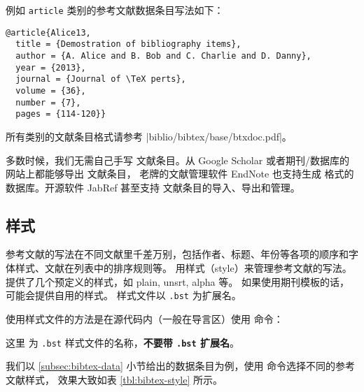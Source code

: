 例如 \texttt{article} 类别的参考文献数据条目写法如下：
\begin{verbatim}
@article{Alice13,
  title = {Demostration of bibliography items},
  author = {A. Alice and B. Bob and C. Charlie and D. Danny},
  year = {2013},
  journal = {Journal of \TeX perts},
  volume = {36},
  number = {7},
  pages = {114-120}}
\end{verbatim}
所有类别的文献条目格式请参考 \CTAN|biblio/bibtex/base/btxdoc.pdf|。

多数时候，我们无需自己手写  文献条目。从 Google Scholar 或者期刊/数据库的网站上都能够导出  文献条目，
老牌的文献管理软件 EndNote 也支持生成  格式的数据库。开源软件 JabRef 甚至支持  文献条目的导入、导出和管理。

\subsection{ 样式}\label{subsec:bibtex-style}

参考文献的写法在不同文献里千差万别，包括作者、标题、年份等各项的顺序和字体样式、文献在列表中的排序规则等。
 用样式（style）来管理参考文献的写法。 提供了几个预定义的样式，如 plain, unsrt, alpha 等。
如果使用期刊模板的话，可能会提供自用的样式。
样式文件以 \texttt{.bst} 为扩展名。

使用样式文件的方法是在源代码内（一般在导言区）使用  命令：
\begin{command}
\end{command}
这里  为 \texttt{.bst} 样式文件的名称，\textbf{不要带 \texttt{.bst} 扩展名}。

我们以 \ref{subsec:bibtex-data} 小节给出的数据条目为例，使用  命令选择不同的参考文献样式，
效果大致如表 \ref{tbl:bibtex-style} 所示。

